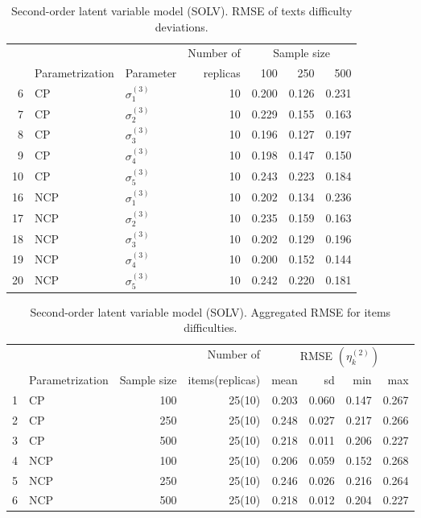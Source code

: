 \begin{table}[H]
	\centering
	\begin{tabular}{rllrrrr}
		\hline
		\multicolumn{3}{c}{ } & Number of &\multicolumn{3}{c}{ Sample size } \\ 
		\cmidrule(rl){5-7}
		& Parametrization & Parameter & replicas & 100 & 250 & 500 \\  
		\hline\hline
		6 & CP & $\sigma^{(3)}_{1}$ &   10 & 0.200 & 0.126 & 0.231 \\ 
		7 & CP & $\sigma^{(3)}_{2}$ &   10 & 0.229 & 0.155 & 0.163 \\ 
		8 & CP & $\sigma^{(3)}_{3}$ &   10 & 0.196 & 0.127 & 0.197 \\ 
		9 & CP & $\sigma^{(3)}_{4}$ &   10 & 0.198 & 0.147 & 0.150 \\ 
		10 & CP & $\sigma^{(3)}_{5}$ &   10 & 0.243 & 0.223 & 0.184 \\ 
		\hline
		16 & NCP & $\sigma^{(3)}_{1}$ &   10 & 0.202 & 0.134 & 0.236 \\ 
		17 & NCP & $\sigma^{(3)}_{2}$ &   10 & 0.235 & 0.159 & 0.163 \\ 
		18 & NCP & $\sigma^{(3)}_{3}$ &   10 & 0.202 & 0.129 & 0.196 \\ 
		19 & NCP & $\sigma^{(3)}_{4}$ &   10 & 0.200 & 0.152 & 0.144 \\ 
		20 & NCP & $\sigma^{(3)}_{5}$ &   10 & 0.242 & 0.220 & 0.181 \\ 
		\hline
	\end{tabular}
	\caption[Second-order latent variable model (SOLV). RMSE of texts difficulty deviations.]%
	{Second-order latent variable model (SOLV). RMSE of texts difficulty deviations.}
	\label{tab:SOLV_RMSE_texts_dev}
\end{table}
%
\begin{table}[ht]
	\centering
	\begin{tabular}{rlrrrrrr}
		\hline
		\multicolumn{3}{c}{ } & Number of &\multicolumn{4}{c}{ RMSE $( \eta^{(2)}_{k} )$ } \\ 
		\cmidrule(rl){5-8}
		& Parametrization & Sample size & items(replicas) & mean & sd & min & max \\  
		\hline\hline
		1 & CP &  100 & 25(10) & 0.203 & 0.060 & 0.147 & 0.267 \\ 
		2 & CP &  250 & 25(10) & 0.248 & 0.027 & 0.217 & 0.266 \\
		3 & CP &  500 & 25(10) & 0.218 & 0.011 & 0.206 & 0.227 \\  
		\hline
		4 & NCP &  100 & 25(10) & 0.206 & 0.059 & 0.152 & 0.268 \\ 
		5 & NCP &  250 & 25(10) & 0.246 & 0.026 & 0.216 & 0.264 \\
		6 & NCP &  500 & 25(10) & 0.218 & 0.012 & 0.204 & 0.227 \\ 
		\hline
	\end{tabular}
	\caption[Second-order latent variable model (SOLV). Aggregated RMSE for items difficulties.]%
	{Second-order latent variable model (SOLV). Aggregated RMSE for items difficulties.}
	\label{tab:SOLV_RMSE_items}
\end{table}
